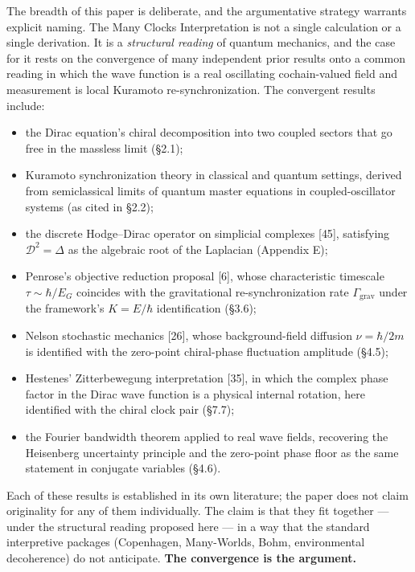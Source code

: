 \documentclass[
]{article}
\providecommand{\tightlist}{%
  \setlength{\itemsep}{0pt}\setlength{\parskip}{0pt}}
\begin{document}
The breadth of this paper is deliberate, and the argumentative strategy
warrants explicit naming. The Many Clocks Interpretation is not a single
calculation or a single derivation. It is a \emph{structural reading} of
quantum mechanics, and the case for it rests on the convergence of many
independent prior results onto a common reading in which the wave
function is a real oscillating cochain-valued field and measurement is
local Kuramoto re-synchronization. The convergent results include:

\begin{itemize}
\tightlist
\item
  the Dirac equation's chiral decomposition into two coupled sectors
  that go free in the massless limit (§2.1);
\item
  Kuramoto synchronization theory in classical and quantum settings,
  derived from semiclassical limits of quantum master equations in
  coupled-oscillator systems (as cited in §2.2);
\item
  the discrete Hodge--Dirac operator on simplicial complexes {[}45{]},
  satisfying \(\mathcal{D}^2 = \Delta\) as the algebraic root of the
  Laplacian (Appendix E);
\item
  Penrose's objective reduction proposal {[}6{]}, whose characteristic
  timescale \(\tau \sim \hbar/E_G\) coincides with the gravitational
  re-synchronization rate \(\Gamma_{\mathrm{grav}}\) under the
  framework's \(K = E/\hbar\) identification (§3.6);
\item
  Nelson stochastic mechanics {[}26{]}, whose background-field diffusion
  \(\nu = \hbar/2m\) is identified with the zero-point chiral-phase
  fluctuation amplitude (§4.5);
\item
  Hestenes' Zitterbewegung interpretation {[}35{]}, in which the complex
  phase factor in the Dirac wave function is a physical internal
  rotation, here identified with the chiral clock pair (§7.7);
\item
  the Fourier bandwidth theorem applied to real wave fields, recovering
  the Heisenberg uncertainty principle and the zero-point phase floor as
  the same statement in conjugate variables (§4.6).
\end{itemize}

Each of these results is established in its own literature; the paper
does not claim originality for any of them individually. The claim is
that they fit together --- under the structural reading proposed here
--- in a way that the standard interpretive packages (Copenhagen,
Many-Worlds, Bohm, environmental decoherence) do not anticipate.
\textbf{The convergence is the argument.}
\end{document}
